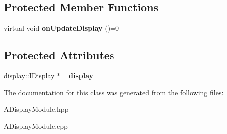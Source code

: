 \subsection*{Protected Member Functions}
\begin{DoxyCompactItemize}
\item 
\mbox{\label{classwood_box_1_1module_1_1_a_display_module_a4748a20ab717b105f60cd7cf6bef3983}} 
virtual void {\bfseries on\+Update\+Display} ()=0
\end{DoxyCompactItemize}
\subsection*{Protected Attributes}
\begin{DoxyCompactItemize}
\item 
\mbox{\label{classwood_box_1_1module_1_1_a_display_module_abd40ae3a519cd2b569631b6910ea342f}} 
\mbox{\hyperlink{classwood_box_1_1display_1_1_i_display}{display\+::\+I\+Display}} $\ast$ {\bfseries \+\_\+display}
\end{DoxyCompactItemize}


The documentation for this class was generated from the following files\+:\begin{DoxyCompactItemize}
\item 
A\+Display\+Module.\+hpp\item 
A\+Display\+Module.\+cpp\end{DoxyCompactItemize}
